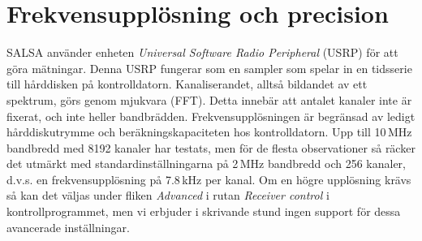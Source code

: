 \section{Frekvensupplösning och precision}
SALSA använder enheten \emph{Universal Software Radio Peripheral} (USRP) för
att göra mätningar. Denna USRP fungerar som en sampler som spelar in en
tidsserie till hårddisken på kontrolldatorn. Kanaliserandet, alltså bildandet
av ett spektrum, görs genom mjukvara (FFT). Detta innebär att antalet kanaler
inte är fixerat, och inte heller bandbrädden. Frekvensupplösningen är begränsad
av ledigt hårddiskutrymme och beräkningskapaciteten hos kontrolldatorn. Upp
till 10\,MHz bandbredd med 8192 kanaler har testats, men för de flesta
observationer så räcker det utmärkt med standardinställningarna på 2\,MHz
bandbredd och 256 kanaler, d.v.s. en frekvensupplösning på 7.8\,kHz per kanal.
Om en högre upplösning krävs så kan det väljas under fliken \emph{Advanced} i
rutan \emph{Receiver control} i kontrollprogrammet, men vi erbjuder i skrivande
stund ingen support för dessa avancerade inställningar. 
